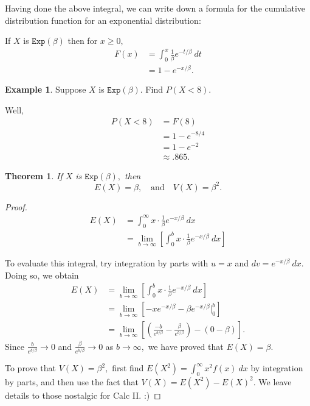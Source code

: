 \documentclass[
]{book}
\newtheorem{theorem}{Theorem}[chapter]
\theoremstyle{definition}
\theoremstyle{definition}
\newtheorem{example}{Example}[chapter]
\theoremstyle{definition}
\theoremstyle{definition}
\theoremstyle{remark}
\begin{document}
Having done the above integral, we can write down a formula for the cumulative distribution function for an exponential distribution:

If \(X\) is \(\texttt{Exp}(\beta)\) then for \(x \geq 0,\)
\begin{align*}
F(x) &= \int_0^x \frac{1}{\beta}e^{-t/\beta}~dt\\
    &= 1 - e^{-x/\beta}.
\end{align*}

\begin{example}
Suppose \(X\) is \(\texttt{Exp}(\beta)\). Find \(P(X < 8)\).

Well,
\begin{align*}
P(X < 8) &= F(8)\\
        &= 1 - e^{-8/4} \\
        &= 1 - e^{-2} \\
        &\approx .865.
\end{align*}
\end{example}

\begin{theorem}
\protect\hypertarget{thm:exponential-EandV}{}\label{thm:exponential-EandV}If \(X\) is \(\texttt{Exp}(\beta),\) then \[E(X) = \beta, ~~~ \text{ and } ~~~ V(X) = \beta^2.\]
\end{theorem}

\begin{proof}
\begin{align*}
E(X)&= \int_0^\infty x\cdot\frac{1}{\beta} e^{-x/\beta}~dx \\
    &= \lim_{b \to \infty}\left[\int_0^b x\cdot\frac{1}{\beta} e^{-x/\beta}~dx\right]
\end{align*}

To evaluate this integral, try integration by parts with \(u = x\) and \(dv = e^{-x/\beta}~dx\). Doing so, we obtain
\begin{align*}
E(X) &= \lim_{b \to \infty}\left[\int_0^b x\cdot\frac{1}{\beta} e^{-x/\beta}~dx\right]\\
    &= \lim_{b \to \infty}\left[-xe^{-x/\beta} - \beta e^{-x/\beta}\biggr|_0^b\right]\\
    &= \lim_{b \to \infty}\left[\left(\frac{-b}{e^{b/\beta}} - \frac{\beta}{e^{b/\beta}}\right) - \left(0 - \beta\right)\right].
\end{align*}
Since \(\displaystyle \frac{b}{e^{b/\beta}} \to 0\) and \(\displaystyle \frac{\beta}{e^{b/\beta}} \to 0\) as \(b \to \infty,\) we have proved that \(E(X) = \beta.\)

To prove that \(V(X) = \beta^2,\) first find \(E(X^2)=\int_0^\infty x^2 f(x)~dx\) by integration by parts, and then use the fact that \(V(X) = E(X^2)-E(X)^2\). We leave details to those nostalgic for Calc II. :)
\end{proof}
\end{document}
